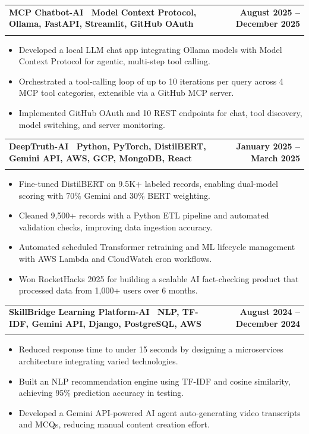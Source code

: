 \documentclass[letterpaper,11pt]{article}
\makeatletter
\newcommand{\resumeItem}[1]{\item\small{#1 \vspace{-4pt}}}
\newcommand{\resumeSubheading}[4]{
    \vspace{-2pt}\item
    \begin{tabular*}{1.0\textwidth}[t]{l@{\extracolsep{\fill}}r}
        \textbf{#1} & \textbf{\small #2} \\
        \textit{\small#3} & \textit{\small #4}
    \end{tabular*}\vspace{-7pt}
}
\newcommand{\resumeItemListStart}{\begin{itemize}}
\newcommand{\resumeItemListEnd}{\end{itemize}\vspace{-7pt}}
\makeatother
\begin{document}
\resumeSubheading
{\textbf{MCP Chatbot-AI} \textnormal{\textbar\ {Model Context Protocol, Ollama, FastAPI, Streamlit, GitHub OAuth}}}{August 2025 -- December 2025}{}{}
\vspace{-0.6cm}
\resumeItemListStart

\resumeItem{Developed a local LLM chat app integrating Ollama models with Model Context Protocol for agentic, multi-step tool calling.}
\vspace{0.15cm}
\resumeItem{Orchestrated a tool-calling loop of up to 10 iterations per query across 4 MCP tool categories, extensible via a GitHub MCP server.}
\vspace{0.15cm}
\resumeItem{Implemented GitHub OAuth and 10 REST endpoints for chat, tool discovery, model switching, and server monitoring.}
\vspace{0.15cm}
\resumeItemListEnd

\resumeSubheading
{\textbf{DeepTruth-AI} \textnormal{\textbar\ {Python, PyTorch, DistilBERT, Gemini API, AWS, GCP, MongoDB, React}}}{January 2025 -- March 2025}{}{}
\vspace{-0.6cm}
\resumeItemListStart

\resumeItem{Fine-tuned DistilBERT on 9.5K+ labeled records, enabling dual-model scoring with 70\% Gemini and 30\% BERT weighting.}
\vspace{0.15cm}
\resumeItem{Cleaned 9,500+ records with a Python ETL pipeline and automated validation checks, improving data ingestion accuracy.}
\vspace{0.15cm}
\resumeItem{Automated scheduled Transformer retraining and ML lifecycle management with AWS Lambda and CloudWatch cron workflows.}
\vspace{0.15cm}
\resumeItem{Won RocketHacks 2025 for building a scalable AI fact-checking product that processed data from 1,000+ users over 6 months.}
\vspace{0.15cm}
\resumeItemListEnd

\resumeSubheading
{\textbf{SkillBridge Learning Platform-AI} \textnormal{\textbar\ {NLP, TF-IDF, Gemini API, Django, PostgreSQL, AWS}}}{August 2024 -- December 2024}{}{}
\vspace{-0.6cm}
\resumeItemListStart

\resumeItem{Reduced response time to under 15 seconds by designing a microservices architecture integrating varied technologies.}
\vspace{0.15cm}
\resumeItem{Built an NLP recommendation engine using TF-IDF and cosine similarity, achieving 95\% prediction accuracy in testing.}
\vspace{0.15cm}
\resumeItem{Developed a Gemini API-powered AI agent auto-generating video transcripts and MCQs, reducing manual content creation effort.}
\resumeItemListEnd
\end{document}
